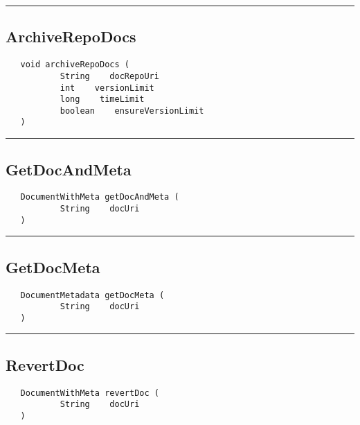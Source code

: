 \rule{15cm}{2pt}
\subsection{ArchiveRepoDocs}
\label{Api:ArchiveRepoDocs}
\begin{verbatim}
   void archiveRepoDocs (
           String    docRepoUri
           int    versionLimit
           long    timeLimit
           boolean    ensureVersionLimit
   )
\end{verbatim}



\rule{15cm}{2pt}
\subsection{GetDocAndMeta}
\label{Api:GetDocAndMeta}
\begin{verbatim}
   DocumentWithMeta getDocAndMeta (
           String    docUri
   )
\end{verbatim}



\rule{15cm}{2pt}
\subsection{GetDocMeta}
\label{Api:GetDocMeta}
\begin{verbatim}
   DocumentMetadata getDocMeta (
           String    docUri
   )
\end{verbatim}



\rule{15cm}{2pt}
\subsection{RevertDoc}
\label{Api:RevertDoc}
\begin{verbatim}
   DocumentWithMeta revertDoc (
           String    docUri
   )
\end{verbatim}




